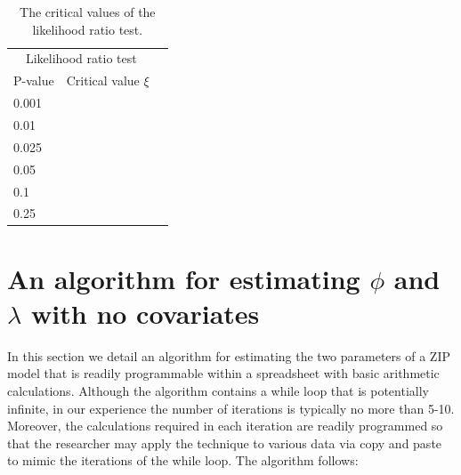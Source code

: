 \documentclass{article}
\begin{document}
\begin{table}
 \label{tab:table1}
\begin{center}
\begin{tabular}{llr}
\hline
\multicolumn{2}{c}{Likelihood ratio test} \\
\cline{1-2}
P-value & Critical value $\xi$ \\
\hline
0.001 & \\
0.01 & \\
0.025 &\\
0.05 &\\
0.1 &\\
0.25 &\\
\hline
\end{tabular}
\end{center}
\caption{The critical values of the likelihood ratio test. }
\end{table}

\section{An algorithm for estimating $\phi$ and $\lambda$ with no covariates}

In this section we detail an algorithm for estimating the two parameters of a ZIP model that is readily programmable within a spreadsheet with basic arithmetic calculations. Although the algorithm contains a while loop that is potentially infinite, in our experience the number of iterations is typically no more than 5-10. Moreover, the calculations required in each iteration are readily programmed so that the researcher may apply the technique to various data via copy and paste to mimic the iterations of the while loop. The algorithm follows: 
\end{document}
